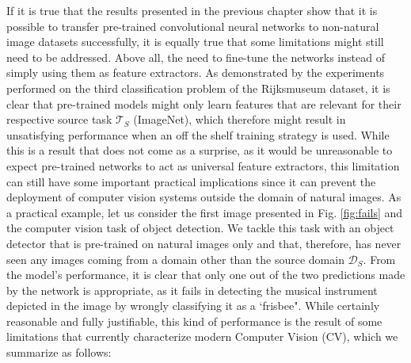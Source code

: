 If it is true that the results presented in the previous chapter show that it is possible to transfer pre-trained convolutional neural networks to non-natural image datasets successfully, it is equally true that some limitations might still need to be addressed. Above all, the need to fine-tune the networks instead of simply using them as feature extractors. As demonstrated by the experiments performed on the third classification problem of the Rijksmuseum dataset, it is clear that pre-trained models might only learn features that are relevant for their respective source task $\mathcal{T}_S$ (ImageNet), which therefore might result in unsatisfying performance when an off the shelf training strategy is used. While this is a result that does not come as a surprise, as it would be unreasonable to expect pre-trained networks to act as universal feature extractors, this limitation can still have some important practical implications since it can prevent the deployment of computer vision systems outside the domain of natural images. As a  practical example, let us consider the first image presented in Fig. \ref{fig:fails} and the computer vision task of object detection. We tackle this task with an object detector that is pre-trained on natural images only and that, therefore, has never seen any images coming from a domain other than the source domain $\mathcal{D}_S$. From the model's performance, it is clear that only one out of the two predictions made by the network is appropriate, as it fails in detecting the musical instrument depicted in the image by wrongly classifying it as a `frisbee". While certainly reasonable and fully justifiable, this kind of performance is the result of some limitations that currently characterize modern Computer Vision (CV), which we summarize as follows:

